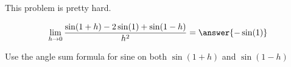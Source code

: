 \documentclass{ximera}
\author{Steven Gubkin}
\begin{document}
\begin{exercise}
	
	\begin{warning}
		This problem is pretty hard.
	\end{warning}
	
	\[\lim_{h \to 0} \frac{\sin(1+h) - 2\sin(1)+\sin(1-h)}{h^2} = \answer{-\sin(1)}\]
	
	\begin{hint}
		Use the angle sum formula for sine on both $\sin(1+h)$ and $\sin(1-h)$
	\end{hint}


\end{exercise}
\end{document}
